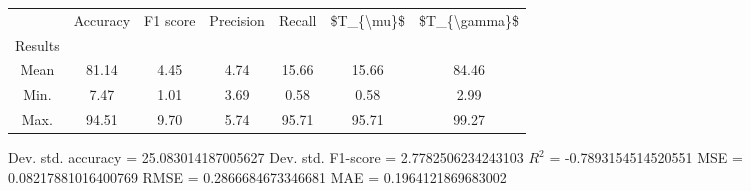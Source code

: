 \begin{tabular}{|c|c|c|c|c|c|c|}
\toprule
{} &  Accuracy &  F1 score &  Precision &  Recall &  \$T\_\{\textbackslash mu\}\$ &  \$T\_\{\textbackslash gamma\}\$ \\
Results &           &           &            &         &            &               \\
\hline
Mean    &     81.14 &      4.45 &       4.74 &   15.66 &      15.66 &         84.46 \\
Min.    &      7.47 &      1.01 &       3.69 &    0.58 &       0.58 &          2.99 \\
Max.    &     94.51 &      9.70 &       5.74 &   95.71 &      95.71 &         99.27 \\
\bottomrule
\end{tabular}

 Dev. std. accuracy = 25.083014187005627
 Dev. std. F1-score = 2.7782506234243103
 $R^2$ = -0.7893154514520551
 MSE = 0.08217881016400769
 RMSE = 0.2866684673346681
 MAE = 0.1964121869683002